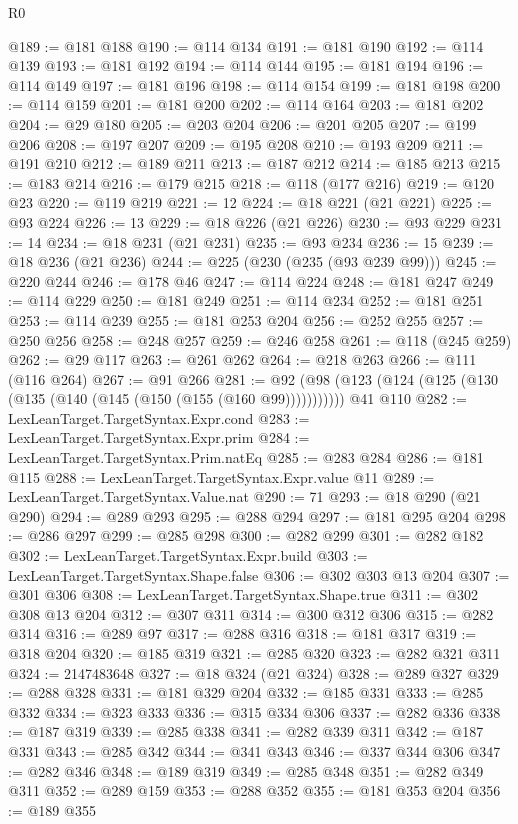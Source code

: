 \begin{lexlean}{R0}
\begin{coremodule}
@189 := @181 @188
@190 := @114 @134
@191 := @181 @190
@192 := @114 @139
@193 := @181 @192
@194 := @114 @144
@195 := @181 @194
@196 := @114 @149
@197 := @181 @196
@198 := @114 @154
@199 := @181 @198
@200 := @114 @159
@201 := @181 @200
@202 := @114 @164
@203 := @181 @202
@204 := @29 @180
@205 := @203 @204
@206 := @201 @205
@207 := @199 @206
@208 := @197 @207
@209 := @195 @208
@210 := @193 @209
@211 := @191 @210
@212 := @189 @211
@213 := @187 @212
@214 := @185 @213
@215 := @183 @214
@216 := @179 @215
@218 := @118 (@177 @216)
@219 := @120 @23
@220 := @119 @219
@221 := 12
@224 := @18 @221 (@21 @221)
@225 := @93 @224
@226 := 13
@229 := @18 @226 (@21 @226)
@230 := @93 @229
@231 := 14
@234 := @18 @231 (@21 @231)
@235 := @93 @234
@236 := 15
@239 := @18 @236 (@21 @236)
@244 := @225 (@230 (@235 (@93 @239 @99)))
@245 := @220 @244
@246 := @178 @46
@247 := @114 @224
@248 := @181 @247
@249 := @114 @229
@250 := @181 @249
@251 := @114 @234
@252 := @181 @251
@253 := @114 @239
@255 := @181 @253 @204
@256 := @252 @255
@257 := @250 @256
@258 := @248 @257
@259 := @246 @258
@261 := @118 (@245 @259)
@262 := @29 @117
@263 := @261 @262
@264 := @218 @263
@266 := @111 (@116 @264)
@267 := @91 @266
@281 := @92 (@98 (@123 (@124 (@125 (@130 (@135 (@140 (@145 (@150 (@155 (@160 @99))))))))))) @41 @110
@282 := LexLeanTarget.TargetSyntax.Expr.cond
@283 := LexLeanTarget.TargetSyntax.Expr.prim
@284 := LexLeanTarget.TargetSyntax.Prim.natEq
@285 := @283 @284
@286 := @181 @115
@288 := LexLeanTarget.TargetSyntax.Expr.value @11
@289 := LexLeanTarget.TargetSyntax.Value.nat
@290 := 71
@293 := @18 @290 (@21 @290)
@294 := @289 @293
@295 := @288 @294
@297 := @181 @295 @204
@298 := @286 @297
@299 := @285 @298
@300 := @282 @299
@301 := @282 @182
@302 := LexLeanTarget.TargetSyntax.Expr.build
@303 := LexLeanTarget.TargetSyntax.Shape.false
@306 := @302 @303 @13 @204
@307 := @301 @306
@308 := LexLeanTarget.TargetSyntax.Shape.true
@311 := @302 @308 @13 @204
@312 := @307 @311
@314 := @300 @312 @306
@315 := @282 @314
@316 := @289 @97
@317 := @288 @316
@318 := @181 @317
@319 := @318 @204
@320 := @185 @319
@321 := @285 @320
@323 := @282 @321 @311
@324 := 2147483648
@327 := @18 @324 (@21 @324)
@328 := @289 @327
@329 := @288 @328
@331 := @181 @329 @204
@332 := @185 @331
@333 := @285 @332
@334 := @323 @333
@336 := @315 @334 @306
@337 := @282 @336
@338 := @187 @319
@339 := @285 @338
@341 := @282 @339 @311
@342 := @187 @331
@343 := @285 @342
@344 := @341 @343
@346 := @337 @344 @306
@347 := @282 @346
@348 := @189 @319
@349 := @285 @348
@351 := @282 @349 @311
@352 := @289 @159
@353 := @288 @352
@355 := @181 @353 @204
@356 := @189 @355

\end{coremodule}
\end{lexlean}
